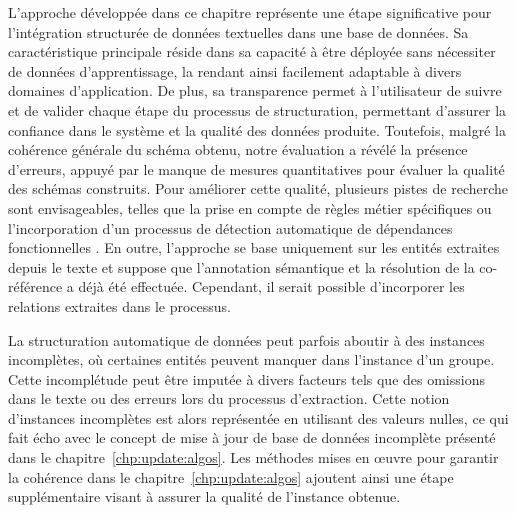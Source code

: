 L'approche développée dans ce chapitre représente une étape significative pour l'intégration structurée de données textuelles dans une base de données.
Sa caractéristique principale réside dans sa capacité à être déployée sans nécessiter de données d'apprentissage, la rendant ainsi facilement adaptable à divers domaines d'application.
De plus, sa transparence permet à l'utilisateur de suivre et de valider chaque étape du processus de structuration, permettant d'assurer la confiance dans le système et la qualité des données produite.
Toutefois, malgré la cohérence générale du schéma obtenu, notre évaluation a révélé la présence d'erreurs, appuyé par le manque de mesures quantitatives pour évaluer la qualité des schémas construits.
Pour améliorer cette qualité, plusieurs pistes de recherche sont envisageables, telles que la prise en compte de règles métier spécifiques ou l'incorporation d'un processus de détection automatique de dépendances fonctionnelles \cite{papenbrockFunctionalDependencyDiscovery2015}.
En outre, l'approche se base uniquement sur les entités extraites depuis le texte et suppose que l'annotation sémantique et la résolution de la co-référence a déjà été effectuée.
Cependant, il serait possible d'incorporer les relations extraites dans le processus.

La structuration automatique de données peut parfois aboutir à des instances incomplètes, où certaines entités peuvent manquer dans l'instance d'un groupe.
Cette incomplétude peut être imputée à divers facteurs tels que des omissions dans le texte ou des erreurs lors du processus d'extraction.
Cette notion d'instances incomplètes est alors représentée en utilisant des valeurs nulles, ce qui fait écho avec le concept de mise à jour de base de données incomplète présenté dans le chapitre~\ref{chp:update:algos}.
Les méthodes mises en œuvre pour garantir la cohérence dans le chapitre~\ref{chp:update:algos} ajoutent ainsi une étape supplémentaire visant à assurer la qualité de l'instance obtenue.
